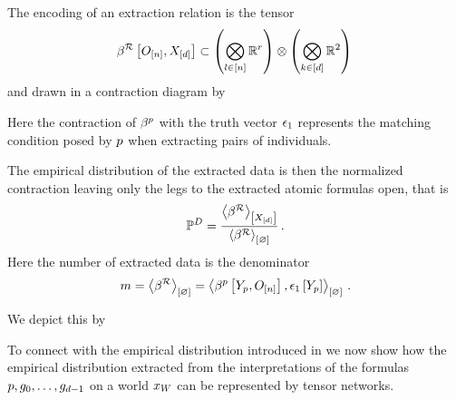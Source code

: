 The encoding of an extraction relation is the tensor
\begin{align*}
    \bencodingofat{\extractionrelation}{\shortindvariables,\shortcatvariables} \subset \left(\indspace\right) \otimes \left(\atomspace\right) \,
\end{align*}
and drawn in a contraction diagram by
\begin{center}
    
\end{center}
Here the contraction of $\beta^{p}$ with the truth vector $\epsilon_{1}$ represents the matching condition posed by $p$ when extracting pairs of individuals.

The empirical distribution of the extracted data is then the normalized contraction leaving only the legs to the extracted atomic formulas open, that is
\begin{align*}
    \mathbb{P}^{D}
    = \frac{
        \left\langle \beta^{\mathcal{R}}\right\rangle_{\left[ X_{[d]} \right]}
    }{
        \left\langle \beta^{\mathcal{R}}\right\rangle_{\left[ \varnothing \right]}
    }  \, .
\end{align*}
Here the number of extracted data is the denominator
\begin{align*}
    \datanum
    = \contraction{\bencodingof{\extractionrelation}}
    = \contraction{\bencodingofat{\impformula}{\headvariableof{\impformula},\shortindvariables},\tbasisat{\headvariableof{\impformula}}}\, .
\end{align*}

We depict this by
\begin{center}
    
\end{center}


To connect with the empirical distribution introduced in  we now show how the empirical distribution extracted from the interpretations of the formulas $p,g_{0},\ldots,g_{d-1}$ on a \firstOrderLogic{} world $x_{W}$ can be represented by tensor networks.

